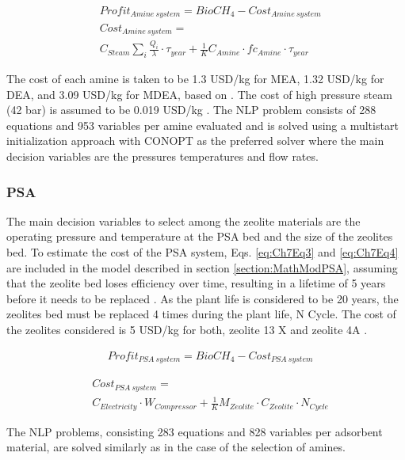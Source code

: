 \begin{refsection}[referencesCh7]
\begin{align}
	& Profit_{{Amine \ system}} = BioCH_{4} - Cost_{{Amine \ system}} \label{eq:Ch7Eq1}\\
	& Cost_{{Amine \ system}} = \nonumber \\
	& C_{{Steam}}\sum\limits_i \frac{Q_i}{\lambda} \cdot \tau _{{year}} + \frac{1}{K} C_{{Amine}}\cdot fc_{{Amine}} \cdot \tau _{{year}} \label{eq:Ch7Eq2}
\end{align}

The cost of each amine is taken to be 1.3 USD/kg for MEA, 1.32 USD/kg for DEA, and 3.09 USD/kg for MDEA, based on \citet{nuchitprasittichai2013optimization}. The cost of high pressure steam (42 bar) is assumed to be 0.019 USD/kg \citep{perez2019superstructure}. The NLP problem consists of 288 equations and 953 variables per amine evaluated and is solved using a multistart initialization approach with CONOPT as the preferred solver where the main decision variables are the pressures temperatures and flow rates.

\subsubsection{PSA}
The main decision variables to select among the zeolite materials are the operating pressure and temperature at the PSA bed and the size of the zeolites bed. To estimate the cost of the PSA system, Eqs. \ref{eq:Ch7Eq3} and \ref{eq:Ch7Eq4} are included in the model described in section \ref{section:MathModPSA}, assuming that the zeolite bed loses efficiency over time, resulting in a lifetime of 5 years before it needs to be replaced \citep{Xiao2013}. As the plant life is considered to be 20 years, the zeolites bed must be replaced 4 times during the plant life, N Cycle. The cost of the zeolites considered is 5 USD/kg for both, zeolite 13 X and zeolite 4A \citep{Xiao2013}.

\begin{align}
& Profit_{{PSA \ system}} = BioCH_{4} - Cost_{{PSA \ system}} \label{eq:Ch7Eq3}
\end{align}

\begin{align}
& Cost_{{PSA \ system}} =  \label{eq:Ch7Eq4} \\
& C_{Electricity} \cdot W_{{Compressor}} + \frac{1}{K} M_{{Zeolite}}\cdot C_{{Zeolite}}\cdot N_{{Cycle}} \nonumber
\end{align}

The NLP problems, consisting 283 equations and 828 variables per adsorbent material, are solved similarly as in the case of the selection of amines.


\end{refsection}
